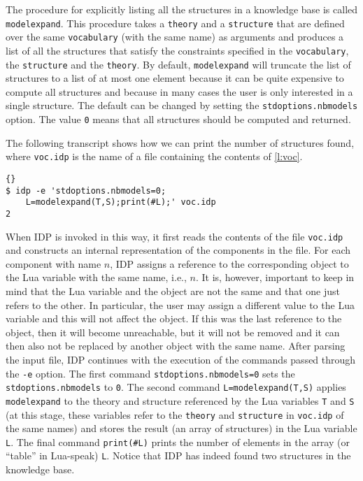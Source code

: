 \documentclass{article}
\newcommand{\idp}{{\sc IDP}\xspace}
\begin{document}
The procedure for explicitly listing all the structures
in a knowledge base is called \lstinline{modelexpand}.
This procedure takes a \texttt{theory} and a \texttt{structure}
that are defined over the same \texttt{vocabulary} (with the same name)
as arguments
and produces a list of all the structures that satisfy the
constraints specified in the \texttt{vocabulary}, the \texttt{structure}
and the \texttt{theory}.
By default, \lstinline{modelexpand} will truncate the list
of structures to a list of at most one element because it can
be quite expensive to compute all structures and because in many
cases the user is only interested in a single structure.
The default can be changed by setting the
\lstinline{stdoptions.nbmodels} option.  The value \lstinline{0}
means that all structures should be computed and returned.

The following transcript shows how we can print the number
of structures found, where \texttt{voc.idp} is the name of a file
containing the contents of \autoref{l:voc}.
\begin{lstlisting}{}
$ idp -e 'stdoptions.nbmodels=0;
    L=modelexpand(T,S);print(#L);' voc.idp 
2
\end{lstlisting}
When \idp is invoked in this way, it
first reads the contents of the file \texttt{voc.idp}
and constructs an internal representation of the components in the file.
For each component with name $n$, \idp assigns a reference to the
corresponding object to the Lua variable with the same name, i.e., $n$.
It is, however, important to keep in mind that the Lua variable
and the object are not the same and that one just refers to the other.
In particular, the user may assign a different value to the Lua
variable and this will not affect the object.  If this was the last
reference to the object, then it will become unreachable, but it will
not be removed and it can then also not be replaced by another object
with the same name.
After parsing the input file, \idp continues with the execution of
the commands passed through the \lstinline{-e} option.
The first command \lstinline{stdoptions.nbmodels=0} sets
the \lstinline{stdoptions.nbmodels} to \lstinline{0}.
The second command \lstinline{L=modelexpand(T,S)} applies
\lstinline{modelexpand} to the theory and structure referenced
by the Lua variables \lstinline{T} and \lstinline{S} (at this stage,
these variables refer to the \lstinline{theory} and \lstinline{structure}
in \lstinline{voc.idp} of the same names) and stores the result
(an array of structures) in the Lua variable \lstinline{L}.
The final command \lstinline{print(#L)} prints the number of elements
in the array (or ``table'' in Lua-speak) \lstinline{L}.
Notice that \idp has indeed found two structures in the knowledge base.
\end{document}
